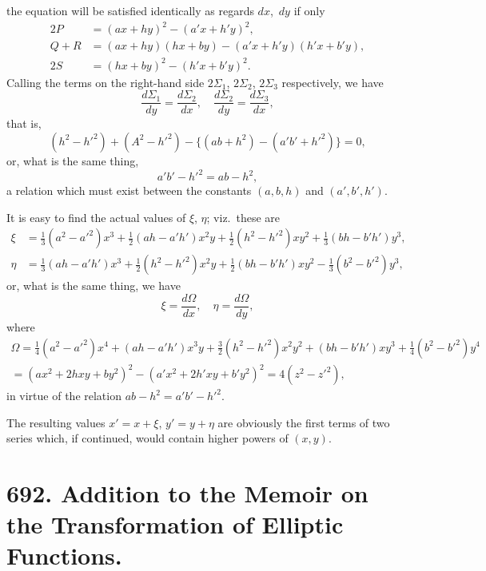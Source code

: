 \documentclass[11pt,a4paper]{book}
\begin{document}
\newpage
\noindent the equation will be satisfied identically as regards $dx$,~$dy$ if only
\begin{align*}
2P &= (ax + hy)^2 - (a'x + h'y)^2,\\
Q + R &= (ax + hy)(hx + by) - (a'x + h'y)(h'x + b'y),\\
2S &= (hx + by)^2 - (h'x + b'y)^2.
\end{align*}
Calling the terms on the right-hand side $2\Sigma_1$, $2\Sigma_2$, $2\Sigma_3$ respectively, we have
\[
\frac{d\Sigma_1}{dy} = \frac{d\Sigma_2}{dx},\quad \frac{d\Sigma_2}{dy} = \frac{d\Sigma_3}{dx},
\]
that is,
\[
(h^2 - h'^2) + (A^2 - h'^2) - \{(ab + h^2) - (a'b' + h'^2)\} = 0,
\]
or, what is the same thing,
\[
a'b' - h'^2 = ab - h^2,
\]
a relation which must exist between the constants $(a, b, h)$ and $(a', b', h')$.

It is easy to find the actual values of $\xi$, $\eta$; viz.\ these are
\begin{align*}
\xi &= \tfrac{1}{3}(a^2 - a'^2)x^3 + \tfrac{1}{2}(ah - a'h')x^2y + \tfrac{1}{2}(h^2 - h'^2)xy^2 + \tfrac{1}{3}(bh - b'h')y^3,\\
\eta &= \tfrac{1}{3}(ah - a'h')x^3 + \tfrac{1}{2}(h^2 - h'^2)x^2y + \tfrac{1}{2}(bh - b'h')xy^2 - \tfrac{1}{3}(b^2 - b'^2)y^3,
\end{align*}
or, what is the same thing, we have
\[
\xi = \frac{d\Omega}{dx},\quad \eta = \frac{d\Omega}{dy},
\]
where
\begin{multline*}
\Omega = \tfrac{1}{4}(a^2 - a'^2)x^4 + (ah - a'h')x^3y + \tfrac{3}{2}(h^2 - h'^2)x^2y^2 + (bh - b'h')xy^3 + \tfrac{1}{4}(b^2 - b'^2)y^4\\
= (ax^2 + 2hxy + by^2)^2 - (a'x^2 + 2h'xy + b'y^2)^2 = 4(z^2 - z'^2),
\end{multline*}
in virtue of the relation $ab - h^2 = a'b' - h'^2$.

The resulting values $x' = x + \xi$, $y' = y + \eta$ are obviously the first terms of two series which, if continued, would contain higher powers of $(x, y)$.


\newpage
\section*{692. Addition to the Memoir on the Transformation of Elliptic Functions.}
\label{paper:692}
\end{document}
